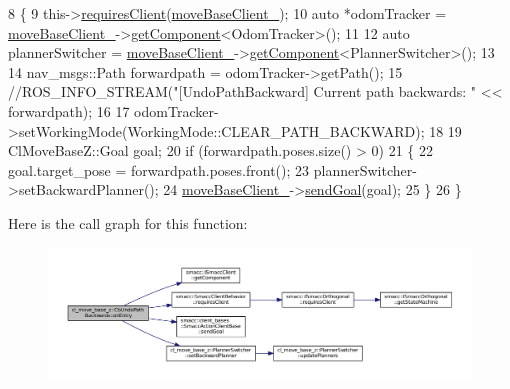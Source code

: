 \begin{DoxyCode}
8 \{
9     this->\hyperlink{classsmacc_1_1SmaccClientBehavior_a917f001e763a1059af337bf4e164f542}{requiresClient}(\hyperlink{classcl__move__base__z_1_1CbUndoPathBackwards_a306d616dab00f50141abed4bfb47aeb2}{moveBaseClient\_});
10     \textcolor{keyword}{auto} *odomTracker = \hyperlink{classcl__move__base__z_1_1CbUndoPathBackwards_a306d616dab00f50141abed4bfb47aeb2}{moveBaseClient\_}->\hyperlink{classsmacc_1_1ISmaccClient_adef78db601749ca63c19e74a27cb88cc}{getComponent}<OdomTracker>();
11 
12     \textcolor{keyword}{auto} plannerSwitcher = \hyperlink{classcl__move__base__z_1_1CbUndoPathBackwards_a306d616dab00f50141abed4bfb47aeb2}{moveBaseClient\_}->\hyperlink{classsmacc_1_1ISmaccClient_adef78db601749ca63c19e74a27cb88cc}{getComponent}<PlannerSwitcher>();
13 
14     nav\_msgs::Path forwardpath = odomTracker->getPath();
15     \textcolor{comment}{//ROS\_INFO\_STREAM("[UndoPathBackward] Current path backwards: " << forwardpath);}
16 
17     odomTracker->setWorkingMode(WorkingMode::CLEAR\_PATH\_BACKWARD);
18 
19     ClMoveBaseZ::Goal goal;
20     \textcolor{keywordflow}{if} (forwardpath.poses.size() > 0)
21     \{
22         goal.target\_pose = forwardpath.poses.front();
23         plannerSwitcher->setBackwardPlanner();
24         \hyperlink{classcl__move__base__z_1_1CbUndoPathBackwards_a306d616dab00f50141abed4bfb47aeb2}{moveBaseClient\_}->\hyperlink{classsmacc_1_1client__bases_1_1SmaccActionClientBase_a9c47a5094ac8afb01680307fe5eca922}{sendGoal}(goal);
25     \}
26 \}
\end{DoxyCode}


Here is the call graph for this function\+:
\nopagebreak
\begin{figure}[H]
\begin{center}
\leavevmode
\includegraphics[width=350pt]{classcl__move__base__z_1_1CbUndoPathBackwards_a32e680530375b62c7053bf173f6b2b1b_cgraph}
\end{center}
\end{figure}


